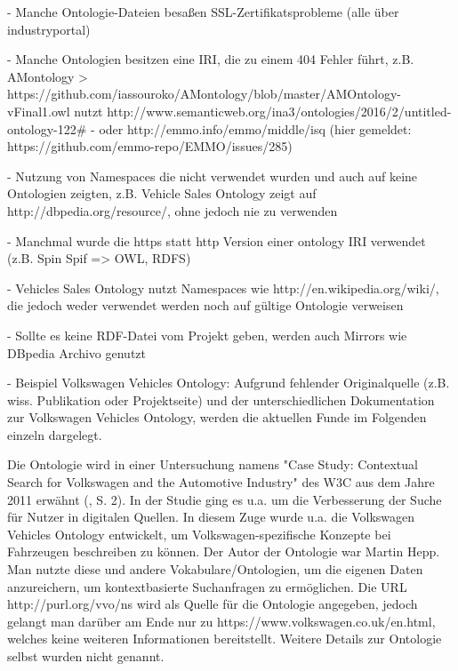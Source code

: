 \documentclass{article}
\begin{document}
- Manche Ontologie-Dateien besaßen SSL-Zertifikatsprobleme (alle über industryportal)

- Manche Ontologien besitzen eine IRI, die zu einem 404 Fehler führt, z.B. AMontology > https://github.com/iassouroko/AMontology/blob/master/AMOntology-vFinal1.owl nutzt http://www.semanticweb.org/ina3/ontologies/2016/2/untitled-ontology-122\#
  - oder http://emmo.info/emmo/middle/isq (hier gemeldet: https://github.com/emmo-repo/EMMO/issues/285)

- Nutzung von Namespaces die nicht verwendet wurden und auch auf keine Ontologien zeigten, z.B. Vehicle Sales Ontology zeigt auf http://dbpedia.org/resource/, ohne jedoch nie zu verwenden

- Manchmal wurde die https statt http Version einer ontology IRI verwendet (z.B. Spin Spif => OWL, RDFS)

- Vehicles Sales Ontology nutzt Namespaces wie http://en.wikipedia.org/wiki/, die jedoch weder verwendet werden noch auf gültige Ontologie verweisen

- Sollte es keine RDF-Datei vom Projekt geben, werden auch Mirrors wie DBpedia Archivo genutzt

%

  - Beispiel Volkswagen Vehicles Ontology: Aufgrund fehlender Originalquelle (z.B. wiss. Publikation oder Projektseite) und der unterschiedlichen Dokumentation zur Volkswagen Vehicles Ontology, werden die aktuellen Funde im Folgenden einzeln dargelegt.

Die Ontologie wird in einer Untersuchung namens "Case Study: Contextual Search for Volkswagen and the Automotive Industry" des W3C aus dem Jahre 2011 erwähnt (\cite{greenly2011case}, S. 2).
In der Studie ging es u.a. um die Verbesserung der Suche für Nutzer in digitalen Quellen.
In diesem Zuge wurde u.a. die Volkswagen Vehicles Ontology entwickelt, um Volkswagen-spezifische Konzepte bei Fahrzeugen beschreiben zu können.
Der Autor der Ontologie war Martin Hepp.
Man nutzte diese und andere Vokabulare/Ontologien, um die eigenen Daten anzureichern, um kontextbasierte Suchanfragen zu ermöglichen.
Die URL http://purl.org/vvo/ns wird als Quelle für die Ontologie angegeben, jedoch gelangt man darüber am Ende nur zu https://www.volkswagen.co.uk/en.html, welches keine weiteren Informationen bereitstellt.
Weitere Details zur Ontologie selbst wurden nicht genannt.
\end{document}
